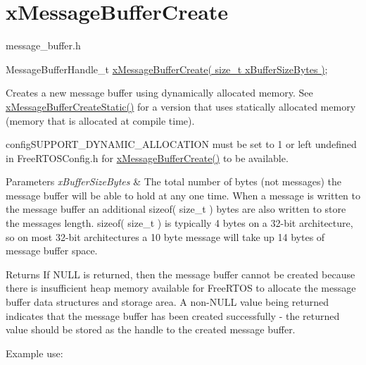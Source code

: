 \hypertarget{group__xMessageBufferCreate}{}\section{x\+Message\+Buffer\+Create}
\label{group__xMessageBufferCreate}
message\+\_\+buffer.\+h


\begin{DoxyPre}
MessageBufferHandle\_t \hyperlink{message__buffer_8h_a2959cd0e3d2bd20d46908e5c9872be36}{xMessageBufferCreate( size\_t xBufferSizeBytes )};
\end{DoxyPre}


Creates a new message buffer using dynamically allocated memory. See \hyperlink{message__buffer_8h_acc84f4a15dbd39ecbad35f7337e78b2c}{x\+Message\+Buffer\+Create\+Static()} for a version that uses statically allocated memory (memory that is allocated at compile time).

config\+S\+U\+P\+P\+O\+R\+T\+\_\+\+D\+Y\+N\+A\+M\+I\+C\+\_\+\+A\+L\+L\+O\+C\+A\+T\+I\+ON must be set to 1 or left undefined in Free\+R\+T\+O\+S\+Config.\+h for \hyperlink{message__buffer_8h_a2959cd0e3d2bd20d46908e5c9872be36}{x\+Message\+Buffer\+Create()} to be available.


\begin{DoxyParams}{Parameters}
{\em x\+Buffer\+Size\+Bytes} & The total number of bytes (not messages) the message buffer will be able to hold at any one time. When a message is written to the message buffer an additional sizeof( size\+\_\+t ) bytes are also written to store the message\textquotesingle{}s length. sizeof( size\+\_\+t ) is typically 4 bytes on a 32-\/bit architecture, so on most 32-\/bit architectures a 10 byte message will take up 14 bytes of message buffer space.\\
\hline
\end{DoxyParams}
\begin{DoxyReturn}{Returns}
If N\+U\+LL is returned, then the message buffer cannot be created because there is insufficient heap memory available for Free\+R\+T\+OS to allocate the message buffer data structures and storage area. A non-\/\+N\+U\+LL value being returned indicates that the message buffer has been created successfully -\/ the returned value should be stored as the handle to the created message buffer.
\end{DoxyReturn}
Example use\+: 
\begin{DoxyPre}\end{DoxyPre}



